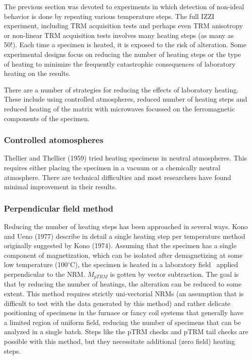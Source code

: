 The previous section was devoted to experiments in which detection of non-ideal behavior is done by repeating various temperature steps.   The full IZZI experiment, including TRM acquisition tests and perhaps even TRM anisotropy or non-linear TRM acquisition tests involves many heating steps (as many as 50!).    Each time a specimen is heated, it is exposed to the risk of alteration.   Some experimental designs focus on reducing the number of heating steps or the type of heating to minimize the frequently catastrophic consequences of laboratory heating on the results.   

There are a number of strategies for reducing the effects of laboratory heating.    These include using controlled atmospheres, reduced number of heating steps and reduced heating of the matrix with microwaves focussed on the ferromagnetic components of the specimen.  


\subsubsection{Controlled atomospheres}

Thellier and Thellier (1959) tried heating specimens in neutral atmospheres.  This requires either placing the specimen in a vacuum or a chemically neutral atmosphere.  There are technical difficulties and most researchers have found minimal improvement in their results.   

\subsubsection{Perpendicular field method}

Reducing the number of heating steps has been approached in several ways. 
 Kono and Ueno (1977) \nocite{kono77} describe in detail a  single heating step per temperature method  originally  suggested by
  Kono (1974).  \nocite{kono74} Assuming that the specimen has a single component of magnetization, which can be  isolated after demagnetizing  at some low temperature (100$^{\circ}$C),   the specimen is heated in a laboratory field \ applied perpendicular to the NRM.  $M_{ pTRM}$ is gotten by vector subtraction.  The goal is that by reducing the number of heatings,  the alteration can be reduced  to some extent.  This method requires strictly uni-vectorial NRMs (an assumption that is difficult to test with the data generated by this method) and rather delicate positioning of specimens in the furnace or fancy coil systems that generally have a limited region of uniform field, reducing the number of specimens that can be analyzed in a single batch.    Steps like the pTRM checks and pTRM tail checks are possible with this method, but they necessitate additional (zero field) heating steps.   
 
